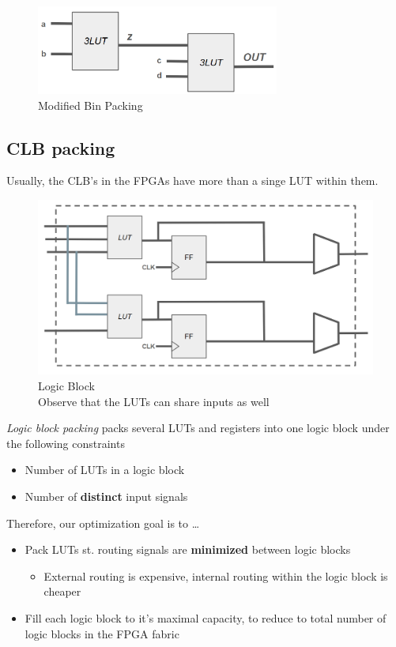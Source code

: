 \documentclass{article}
\begin{document}
\begin{figure}[htp]
    \centering
    \includegraphics[width=8cm, scale=1]{S7/binPacked.PNG}
    \caption{Modified Bin Packing}
\end{figure}

\subsection{CLB packing}
Usually, the CLB's in the FPGAs have more than a singe LUT within them.

\begin{figure}[htp]
    \centering
    \includegraphics[width=12cm, scale=1]{S7/logicBlock.PNG}
    \captionsetup{justification=centering}
    \caption{Logic Block\\
                Observe that the LUTs can share inputs as well}
\end{figure}

\textit{Logic block packing} packs several LUTs and registers into one logic block under the following constraints
\begin{itemize}
    \item Number of LUTs in a logic block
    \item Number of \textbf{distinct} input signals
\end{itemize}

\newpage
Therefore, our optimization goal is to \dots
\begin{itemize}
    \item Pack LUTs st. routing signals are \textbf{minimized} between logic blocks
        \begin{itemize}
            \item External routing is expensive, internal routing within the logic block is cheaper
        \end{itemize}
    \item Fill each logic block to it's maximal capacity, to reduce to total number of logic blocks in the FPGA fabric
\end{itemize}
\end{document}
